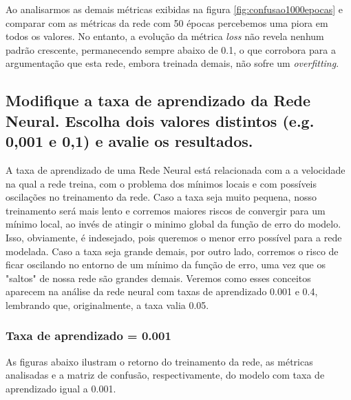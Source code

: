 \documentclass[12pt]{article}
\begin{document}
Ao analisarmos as demais métricas exibidas na figura \ref{fig:confusao1000epocas} e comparar com as métricas da rede com 50 épocas percebemos uma piora em todos os valores. No entanto, a evolução da métrica \textit{loss} não revela nenhum padrão crescente, permanecendo sempre abaixo de 0.1, o que corrobora para a argumentação que esta rede, embora treinada demais, não sofre um \textit{overfitting}.

\subsection{Modifique a taxa de aprendizado da Rede Neural. Escolha dois valores distintos (e.g. 0,001 e 0,1) e avalie os resultados.}

A taxa de aprendizado de uma Rede Neural está relacionada com a a velocidade na qual a rede treina, com o problema dos mínimos locais e com possíveis oscilações no treinamento da rede. Caso a taxa seja muito pequena, nosso treinamento será mais lento e corremos maiores riscos de convergir para um mínimo local, ao invés de atingir o minimo global da função de erro do modelo. Isso, obviamente, é indesejado, pois queremos o menor erro possível para a rede modelada. Caso a taxa seja grande demais, por outro lado, corremos o risco de ficar oscilando no entorno de um mínimo da função de erro, uma vez que os "saltos" de nossa rede são grandes demais. Veremos como esses conceitos aparecem na análise da rede neural com taxas de aprendizado 0.001 e 0.4, lembrando que, originalmente, a taxa valia 0.05. 

\subsubsection{Taxa de aprendizado = 0.001}

As figuras abaixo ilustram o retorno do treinamento da rede, as métricas analisadas e a matriz de confusão, respectivamente, do modelo com taxa de aprendizado igual a 0.001. 
\end{document}
